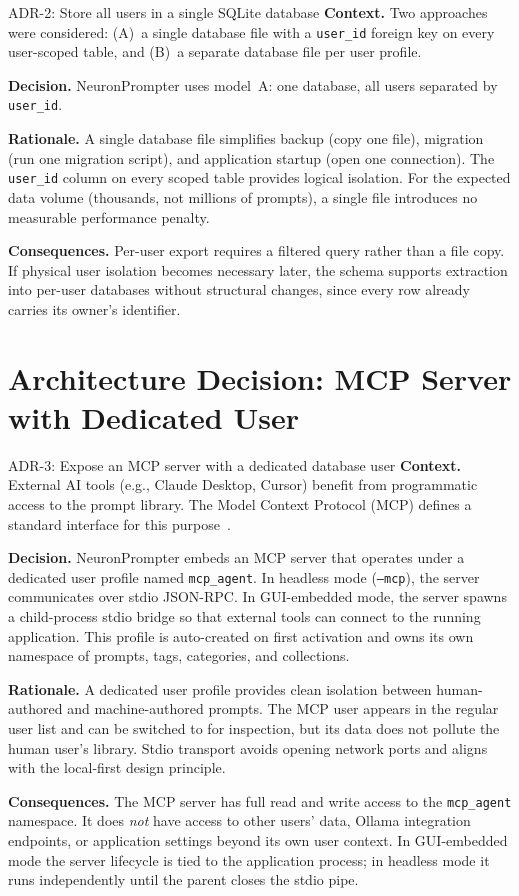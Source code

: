 \documentclass[a4paper, 11pt, oneside]{report}
\begin{document}
\begin{adrbox}{ADR-2: Store all users in a single SQLite database}
\textbf{Context.}\quad
Two approaches were considered: (A)~a single database file with a
\texttt{user\_id} foreign key on every user-scoped table, and (B)~a
separate database file per user profile.

\textbf{Decision.}\quad
NeuronPrompter uses model~A: one database, all users separated by
\texttt{user\_id}.

\textbf{Rationale.}\quad
A single database file simplifies backup (copy one file), migration
(run one migration script), and application startup (open one connection).
The \texttt{user\_id} column on every scoped table provides logical
isolation.  For the expected data volume (thousands, not millions of
prompts), a single file introduces no measurable performance penalty.

\textbf{Consequences.}\quad
Per-user export requires a filtered query rather than a file copy.  If
physical user isolation becomes necessary later, the schema supports
extraction into per-user databases without structural changes, since
every row already carries its owner's identifier.
\end{adrbox}


\section{Architecture Decision: MCP Server with Dedicated User}
\label{sec:adr-mcp}

\begin{adrbox}{ADR-3: Expose an MCP server with a dedicated database user}
\textbf{Context.}\quad
External AI tools (e.g., Claude Desktop, Cursor) benefit from programmatic
access to the prompt library.  The Model Context Protocol (MCP) defines a
standard interface for this purpose~\cite{mcp_spec}.

\textbf{Decision.}\quad
NeuronPrompter embeds an MCP server that operates under a dedicated
user profile named \texttt{mcp\_agent}.  In headless mode
(\texttt{--mcp}), the server communicates over stdio JSON-RPC.  In
GUI-embedded mode, the server spawns a child-process stdio bridge so
that external tools can connect to the running application.  This profile is auto-created on first activation and
owns its own namespace of prompts, tags, categories, and collections.

\textbf{Rationale.}\quad
A dedicated user profile provides clean isolation between human-authored
and machine-authored prompts.  The MCP user appears in the regular user
list and can be switched to for inspection, but its data does not pollute
the human user's library.  Stdio transport avoids opening network ports
and aligns with the local-first design principle.

\textbf{Consequences.}\quad
The MCP server has full read and write access to the \texttt{mcp\_agent}
namespace.  It does \emph{not} have access to other users' data, Ollama
integration endpoints, or application settings beyond its own user context.
In GUI-embedded mode the server lifecycle is tied to the
application process; in headless mode it runs independently until the
parent closes the stdio pipe.
\end{adrbox}
\end{document}
